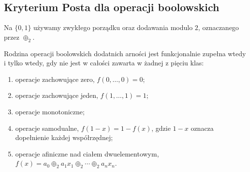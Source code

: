 \subsection{Kryterium Posta dla operacji boolowskich}
Na $\{0,1\}$ używamy zwykłego porządku oraz dodawania
modulo $2$, oznaczanego przez $\oplus_2$.

\begin{twierdzenie}\label{thm:ncl-post-criterion}
Rodzina operacji boolowskich dodatnich arności jest
funkcjonalnie zupełna wtedy i tylko wtedy, gdy nie jest
w całości zawarta w żadnej z pięciu klas:
\begin{enumerate}
\item operacje zachowujące zero, $f(0,\ldots,0)=0$;
\item operacje zachowujące jeden, $f(1,\ldots,1)=1$;
\item operacje monotoniczne;
\item operacje samodualne, $f(1-x)=1-f(x)$,
      gdzie $1-x$ oznacza dopełnienie każdej współrzędnej;
\item operacje afiniczne nad ciałem dwuelementowym,
      $f(x)=a_0\oplus_2 a_1x_1\oplus_2\cdots
      \oplus_2 a_nx_n$.
\end{enumerate}
\end{twierdzenie}
